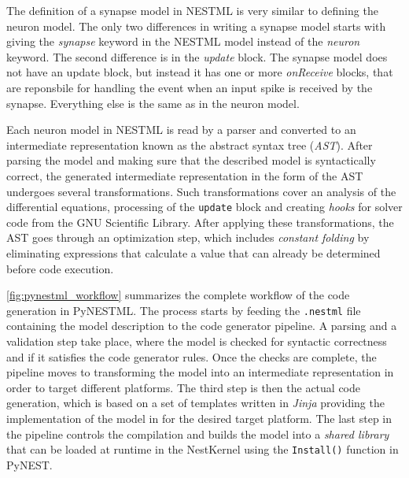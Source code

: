 The definition of a synapse model in NESTML is very similar to defining the neuron model. The only two differences in writing a synapse model starts with giving the \emph{synapse} keyword in the NESTML model instead of the \emph{neuron} keyword. The second difference is in the \emph{update} block. The synapse model does not have an update block, but instead it has one or more \emph{onReceive} blocks, that are reponsbile for handling the event when an input spike is received by the synapse. Everything else is the same as in the neuron model.

Each neuron model in NESTML is read by a parser and converted to an intermediate representation known as the abstract syntax tree (\emph{AST}). After parsing the model and making sure that the described model is syntactically correct, the generated intermediate representation in the form of the AST undergoes several transformations. Such transformations cover an analysis of the differential equations, processing of the \texttt{update} block and creating \emph{hooks} for solver code from the GNU Scientific Library. After applying these transformations, the AST goes through an optimization step, which includes \emph{constant folding} by eliminating expressions that calculate a value that can already be determined before code execution.

\autoref{fig:pynestml_workflow} summarizes the complete workflow of the code generation in PyNESTML. The process starts by feeding the \texttt{.nestml} file containing the model description to the code generator pipeline. A parsing and a validation step take place, where the model is checked for syntactic correctness and if it satisfies the code generator rules. Once the checks are complete, the pipeline moves to transforming the model into an intermediate representation in order to target different platforms. The third step is then the actual code generation, which is based on a set of templates written in \emph{Jinja} \citep{jinja} providing the implementation of the model in for the desired target platform. The last step in the pipeline controls the compilation and builds the model into a \emph{shared library} that can be loaded at runtime in the NestKernel using the \texttt{Install()} function in PyNEST.

